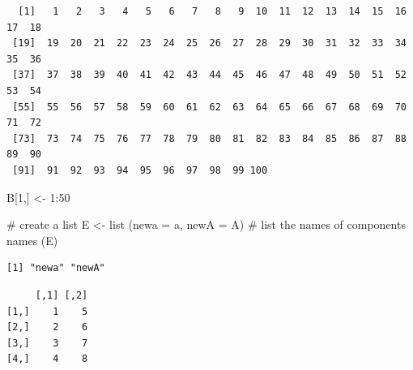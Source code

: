 \documentclass[
  letterpaper,
]{scrbook}
\newenvironment{Shaded}{\begin{snugshade}}{\end{snugshade}}
\newcommand{\AttributeTok}[1]{\textcolor[rgb]{0.40,0.45,0.13}{#1}}
\newcommand{\CommentTok}[1]{\textcolor[rgb]{0.37,0.37,0.37}{#1}}
\newcommand{\DecValTok}[1]{\textcolor[rgb]{0.68,0.00,0.00}{#1}}
\newcommand{\FunctionTok}[1]{\textcolor[rgb]{0.28,0.35,0.67}{#1}}
\newcommand{\NormalTok}[1]{\textcolor[rgb]{0.00,0.23,0.31}{#1}}
\newcommand{\OtherTok}[1]{\textcolor[rgb]{0.00,0.23,0.31}{#1}}
\newcommand{\SpecialCharTok}[1]{\textcolor[rgb]{0.37,0.37,0.37}{#1}}
\newcommand{\StringTok}[1]{\textcolor[rgb]{0.13,0.47,0.30}{#1}}
\begin{document}
\begin{verbatim}
  [1]   1   2   3   4   5   6   7   8   9  10  11  12  13  14  15  16  17  18
 [19]  19  20  21  22  23  24  25  26  27  28  29  30  31  32  33  34  35  36
 [37]  37  38  39  40  41  42  43  44  45  46  47  48  49  50  51  52  53  54
 [55]  55  56  57  58  59  60  61  62  63  64  65  66  67  68  69  70  71  72
 [73]  73  74  75  76  77  78  79  80  81  82  83  84  85  86  87  88  89  90
 [91]  91  92  93  94  95  96  97  98  99 100
\end{verbatim}

\begin{Shaded}
\begin{Highlighting}[]
\NormalTok{B[}\DecValTok{1}\NormalTok{,] }\OtherTok{\textless{}{-}} \DecValTok{1}\SpecialCharTok{:}\DecValTok{50}


\CommentTok{\# create a list}
\NormalTok{E }\OtherTok{\textless{}{-}} \FunctionTok{list}\NormalTok{ (}\AttributeTok{newa =}\NormalTok{ a, }\AttributeTok{newA =}\NormalTok{ A)}
\CommentTok{\# list the names of components}
\FunctionTok{names}\NormalTok{ (E)}
\end{Highlighting}
\end{Shaded}

\begin{verbatim}
[1] "newa" "newA"
\end{verbatim}

\begin{Shaded}
\end{Shaded}

\begin{verbatim}
     [,1] [,2]
[1,]    1    5
[2,]    2    6
[3,]    3    7
[4,]    4    8
\end{verbatim}

\begin{Shaded}
\end{Shaded}
\end{document}
